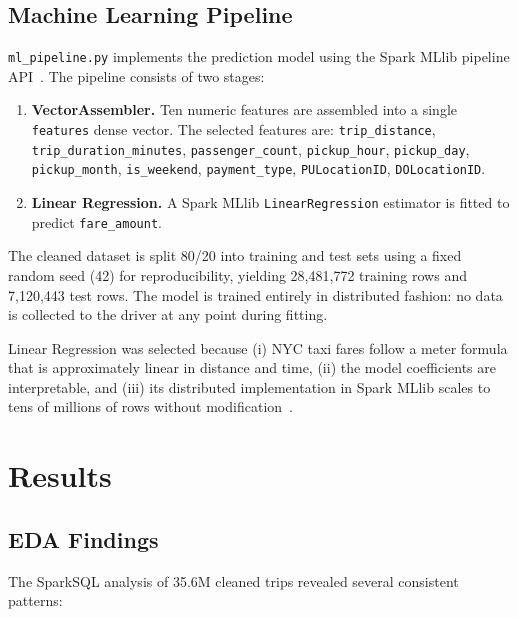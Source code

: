 \documentclass[conference]{IEEEtran}
\begin{document}
\subsection{Machine Learning Pipeline}

\texttt{ml\_pipeline.py} implements the prediction model using
the Spark MLlib pipeline API~\cite{mllib2024}. The pipeline
consists of two stages:

\begin{enumerate}
  \item \textbf{VectorAssembler.} Ten numeric features are
        assembled into a single \texttt{features} dense vector.
        The selected features are:
        \texttt{trip\_distance},
        \texttt{trip\_duration\_minutes},
        \texttt{passenger\_count},
        \texttt{pickup\_hour},
        \texttt{pickup\_day},
        \texttt{pickup\_month},
        \texttt{is\_weekend},
        \texttt{payment\_type},
        \texttt{PULocationID},
        \texttt{DOLocationID}.
  \item \textbf{Linear Regression.} A Spark MLlib
        \texttt{LinearRegression} estimator is fitted to predict
        \texttt{fare\_amount}.
\end{enumerate}

The cleaned dataset is split 80/20 into training and test sets
using a fixed random seed (42) for reproducibility, yielding
28,481,772 training rows and 7,120,443 test rows. The model is
trained entirely in distributed fashion: no data is collected to
the driver at any point during fitting.

Linear Regression was selected because (i) NYC taxi fares follow a
meter formula that is approximately linear in distance and time,
(ii) the model coefficients are interpretable, and (iii) its
distributed implementation in Spark MLlib scales to tens of millions
of rows without modification~\cite{zaharia2016apache}.

\section{Results}
\label{sec:results}

\subsection{EDA Findings}

The SparkSQL analysis of 35.6M cleaned trips revealed several
consistent patterns:
\end{document}
